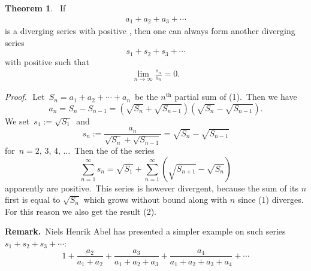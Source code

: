 \documentclass[12pt]{article}
\theoremstyle{definition}
\newtheorem*{thmplain}{Theorem}
\begin{document}
\begin{thmplain}
\, If 
\begin{align}
a_1\!+\!a_2\!+\!a_3\!+\cdots
\end{align}
is a diverging series with positive , then one can always form another diverging series 
$$s_1\!+\!s_2\!+\!s_3\!+\cdots$$
with positive  such that 
\begin{align}
\lim_{n\to\infty}\frac{s_n}{a_n} = 0.
\end{align}
\end{thmplain}

{\em Proof.}\,\, Let\, $S_n = a_1\!+\!a_2\!+\cdots+\!a_n$\, be the $n^\mathrm{th}$ partial sum of (1).\, Then we have 
$$a_n = S_n\!-\!S_{n-1} = 
(\sqrt{S_n}\!+\!\sqrt{S_{n-1}})(\sqrt{S_n}\!-\!\sqrt{S_{n-1}}).$$
We set\, $s_1 := \sqrt{S_1}$\, and
$$s_n := \frac{a_n}{\sqrt{S_n}\!+\!\sqrt{S_{n-1}}} = 
\sqrt{S_n}\!-\!\sqrt{S_{n-1}}$$ 
for\, $n = 2,\,3,\,4,\,\ldots$\, Then the  of the series
$$\sum_{n = 1}^{\infty}s_n = 
    \sqrt{S_1}\!+\!\sum_{n = 1}^{\infty}(\sqrt{S_{n+1}}\!-\!\sqrt{S_n})$$
apparently are positive.\, This series is however divergent, because the sum of its $n$ first  is equal to $\sqrt{S_n}$ which grows without bound along with $n$ since (1) diverges.\, For this reason we also get the result (2).

\textbf{Remark.}\, Niels Henrik Abel has presented a simpler example on such series $s_1\!+\!s_2\!+\!s_3\!+\cdots$:
$$1\!+\!\frac{a_2}{a_1\!+\!a_2}\!+\!\frac{a_3}{a_1\!+\!a_2\!+\!a_3}\!
+\!\frac{a_4}{a_1\!+\!a_2\!+\!a_3\!+\!a_4}\!+\cdots$$
\end{document}
